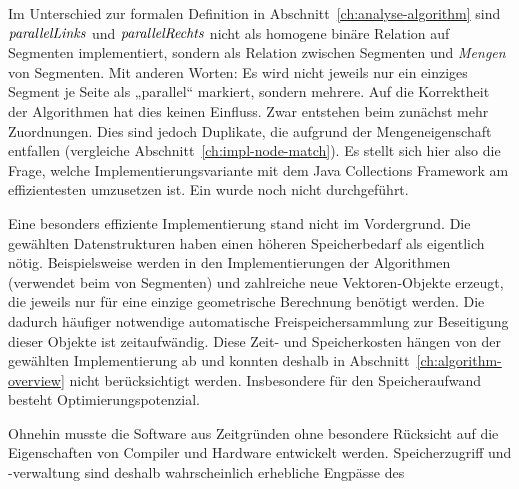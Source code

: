\documentclass[../main/thesis.tex]{subfiles}
\begin{document}
Im Unterschied zur formalen Definition in Abschnitt~\ref{ch:analyse-algorithm} sind $\relation{parallelLinks}$ und $\relation{parallelRechts}$ nicht als homogene binäre Relation auf Segmenten implementiert, sondern als Relation zwischen Segmenten und \emph{Mengen} von Segmenten.
Mit anderen Worten: Es wird nicht jeweils nur ein einziges Segment je Seite als „parallel“ markiert, sondern mehrere.
Auf die Korrektheit der Algorithmen hat dies keinen Einfluss.
Zwar entstehen beim  zunächst mehr Zuordnungen.
Dies sind jedoch Duplikate, die aufgrund der Mengeneigenschaft entfallen (vergleiche Abschnitt~\ref{ch:impl-node-match}).
Es stellt sich hier also die Frage, welche Implementierungsvariante mit dem Java Collections Framework am effizientesten umzusetzen ist.
Ein  wurde noch nicht durchgeführt.

Eine besonders effiziente Implementierung stand nicht im Vordergrund.
Die gewählten Datenstrukturen haben einen höheren Speicherbedarf als eigentlich nötig.
Beispielsweise werden in den Implementierungen der Algorithmen  (verwendet beim  von Segmenten) und  zahlreiche neue Vektoren-Objekte erzeugt, die jeweils nur für eine einzige geometrische Berechnung benötigt werden.
Die dadurch häufiger notwendige automatische Freispeichersammlung  zur Beseitigung dieser Objekte ist zeitaufwändig.
Diese Zeit- und Speicherkosten hängen von der gewählten Implementierung ab und konnten deshalb in Abschnitt~\ref{ch:algorithm-overview} nicht berücksichtigt werden.
Insbesondere für den Speicheraufwand besteht Optimierungspotenzial.


Ohnehin musste die Software aus Zeitgründen ohne besondere Rücksicht auf die Eigenschaften von Compiler und Hardware entwickelt werden.
Speicherzugriff und -verwaltung sind deshalb wahrscheinlich erhebliche Engpässe des 
\end{document}
